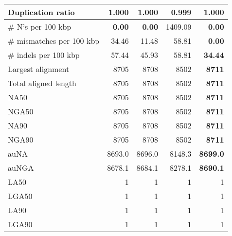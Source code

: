 \documentclass[12pt,a4paper]{article}
\begin{document}
\begin{table}[ht]
\begin{center}
\begin{tabular}{|l*{4}{|r}|}
Duplication ratio & 1.000 & 1.000 & {\bf 0.999} & 1.000 \\ \hline
\# N's per 100 kbp & {\bf 0.00} & {\bf 0.00} & 1409.09 & {\bf 0.00} \\ \hline
\# mismatches per 100 kbp & 34.46 & 11.48 & 58.81 & {\bf 0.00} \\ \hline
\# indels per 100 kbp & 57.44 & 45.93 & 58.81 & {\bf 34.44} \\ \hline
Largest alignment & 8705 & 8708 & 8502 & {\bf 8711} \\ \hline
Total aligned length & 8705 & 8708 & 8502 & {\bf 8711} \\ \hline
NA50 & 8705 & 8708 & 8502 & {\bf 8711} \\ \hline
NGA50 & 8705 & 8708 & 8502 & {\bf 8711} \\ \hline
NA90 & 8705 & 8708 & 8502 & {\bf 8711} \\ \hline
NGA90 & 8705 & 8708 & 8502 & {\bf 8711} \\ \hline
auNA & 8693.0 & 8696.0 & 8148.3 & {\bf 8699.0} \\ \hline
auNGA & 8678.1 & 8684.1 & 8278.1 & {\bf 8690.1} \\ \hline
LA50 & 1 & 1 & 1 & 1 \\ \hline
LGA50 & 1 & 1 & 1 & 1 \\ \hline
LA90 & 1 & 1 & 1 & 1 \\ \hline
LGA90 & 1 & 1 & 1 & 1 \\ \hline
\end{tabular}
\end{center}
\end{table}
\end{document}
